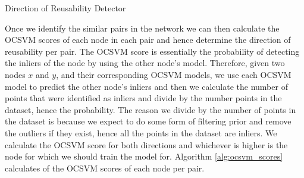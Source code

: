 \documentclass{mpaper}
\begin{document}
\begin{algorithm}
    \DontPrintSemicolon
    \caption{Direction of Reusability Detector
    }\label{alg:ocsvm_scores}
    
    
\end{algorithm}

Once we identify the similar pairs in the network we can then calculate the OCSVM scores of each node in each pair and hence determine the direction of reusability per pair. The OCSVM score is essentially the probability of detecting the inliers of the node by using the other node's model.  Therefore, given two nodes $x$ and $y$, and their corresponding OCSVM models, we use each OCSVM model to predict the other node's inliers and then we calculate the number of points that were identified as inliers and divide by the number points in the dataset, hence the probability. The reason we divide by the number of points in the dataset is because we expect to do some form of filtering prior and remove the outliers if they exist, hence all the points in the dataset are inliers. We calculate the OCSVM score for both directions and whichever is higher is the node for which we should train the model for. Algorithm \ref{alg:ocsvm_scores} calculates of the OCSVM scores of each node per pair.
\end{document}
